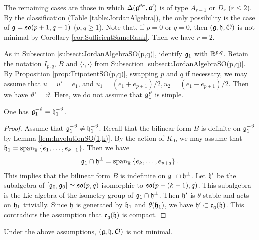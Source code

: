 The remaining cases are those in which $\Delta(\mathfrak{g}^{\theta\sigma}, \mathfrak{a'})$ is of type $A_{r-1}$ or $D_r$ ($r \leq 2$).
By the classification (Table \ref{table:JordanAlgebra}), the only possibility is the case of $\mathfrak{g} = \mathfrak{so}(p+1, q+1)$ ($p, q \geq 1$).
Note that, if $p = 0$ or $q = 0$, then $(\mathfrak{g}, \mathfrak{h}, \mathcal{O})$ is not minimal by Corollary \ref{cor:SufficientSameRank}.
Then we have $r = 2$.

As in Subsection \ref{subsect:JordanAlgebraSO(p,q)}, identify $\mathfrak{g}_1$ with $\mathbb{R}^{p,q}$.
Retain the notation $I_{p,q}$, $B$ and $\langle\cdot, \cdot \rangle$ from Subsection \ref{subsect:JordanAlgebraSO(p,q)}.
By Proposition \ref{prop:TripotentSO(p,q)}, swapping $p$ and $q$ if necessary, we may assume that $u = u' = e_1$, and $u_1 = (e_1 + e_{p+1})/2, u_2 = (e_1 - e_{p+1})/2$.
Then we have $\vartheta' = \vartheta$.
Here, we do not assume that $\mathfrak{g}_1^{\vartheta}$ is simple.

\begin{lemma}\label{lem:Rank2Orthogonal}
	One has $\mathfrak{g}_1^{-\vartheta} = \mathfrak{h}_1^{-\vartheta}$.
\end{lemma}

\begin{proof}
	Assume that $\mathfrak{g}_1^{-\vartheta} \neq \mathfrak{h}_1^{-\vartheta}$.
	Recall that the bilinear form $B$ is definite on $\mathfrak{g}_1^{-\vartheta}$ by Lemma \ref{lem:InvolutionSO(1,k)}.
	By the action of $K_0$, we may assume that $\mathfrak{h}_1 = \mathrm{span}_{\mathbb{R}}\left\{e_1, \ldots, e_{k-1}\right\}$.
	Then we have
	\begin{align*}
		\mathfrak{g}_1 \cap \mathfrak{h}^\perp = \mathrm{span}_{\mathbb{R}}\left\{e_k, \ldots, e_{p+q}\right\}.
	\end{align*}
	This implies that the bilinear form $B$ is indefinite on $\mathfrak{g}_1 \cap \mathfrak{h}^\perp$.
	Let $\mathfrak{h'}$ be the subalgebra of $[\mathfrak{g}_0, \mathfrak{g}_0] \simeq \mathfrak{so}(p, q)$ isomorphic to $\mathfrak{so}(p - (k-1), q)$.
	This subalgebra is the Lie algebra of the isometry group of $\mathfrak{g}_1\cap \mathfrak{h}^\perp$.
	Then $\mathfrak{h'}$ is $\theta$-stable and acts on $\mathfrak{h}_1$ trivially.
	Since $\mathfrak{h}$ is generated by $\mathfrak{h}_1$ and $\theta(\mathfrak{h}_1)$, we have $\mathfrak{h'}\subset \mathfrak{c}_{\mathfrak{g}}(\mathfrak{h})$.
	This contradicts the assumption that $\mathfrak{c}_{\mathfrak{g}}(\mathfrak{h})$ is compact.
\end{proof}

\begin{lemma}
	Under the above assumptions, $(\mathfrak{g}, \mathfrak{h}, \mathcal{O})$ is not minimal.
\end{lemma}

